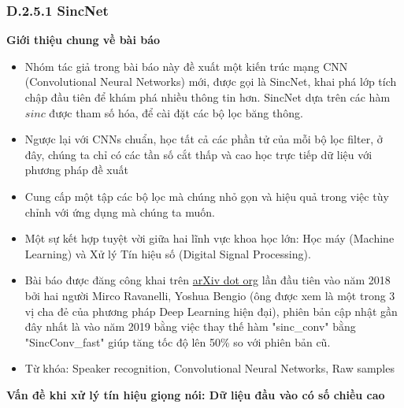 \documentclass{article}
\begin{document}
	\subsubsection{D.2.5.1 SincNet}
	\qquad \textbf{Giới thiệu chung về bài báo}
	\begin{itemize}
		\item Nhóm tác giả trong bài báo này đề xuất một kiến trúc mạng CNN (Convolutional Neural Networks) mới, được gọi là SincNet, khai phá lớp tích chập đầu tiên để khám phá nhiều thông tin hơn. SincNet dựa trên các hàm $sinc$ được tham số hóa, để cài đặt các bộ lọc băng thông.
		\item Ngược lại với CNNs chuẩn, học tất cả các phần tử của mỗi bộ lọc filter, ở đây, chúng ta chỉ có các tần số cắt thấp và cao học trực tiếp dữ liệu với phương pháp đề xuất
		\item Cung cấp một tập các bộ lọc mà chúng nhỏ gọn và hiệu quả trong việc tùy chỉnh với ứng dụng mà chúng ta muốn.
		\item Một sự kết hợp tuyệt vời giữa hai lĩnh vực khoa học lớn: Học máy (Machine Learning) và Xử lý Tín hiệu số (Digital Signal Processing).
		\item Bài báo được đăng công khai trên \href{arxiv.org}{arXiv dot org} lần đầu tiên vào năm 2018 bởi hai người Mirco Ravanelli, Yoshua Bengio (ông được xem là một trong 3 vị cha đẻ của phương pháp Deep Learning hiện đại), phiên bản cập nhật gần đây nhất là vào năm 2019 bằng việc thay thế hàm "sinc\_conv" bằng "SincConv\_fast" giúp tăng tốc độ lên 50\% so với phiên bản cũ.
		\item Từ khóa: Speaker recognition, Convolutional Neural Networks, Raw samples
	\end{itemize}
	 
	\textbf{Vấn đề khi xử lý tín hiệu giọng nói: Dữ liệu đầu vào có số chiều cao}
	
\end{document}
